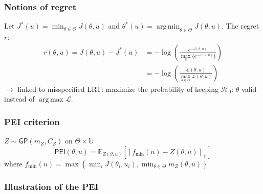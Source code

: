 \documentclass[11pt]{beamer}
\newcommand{\Ex}{\mathbb{E}}
\newcommand{\GP}{\mathsf{GP}}
\DeclareMathOperator*{\argmin}{arg\,min}
\DeclareMathOperator*{\argmax}{arg\,max}
\newcommand{\kk}{\theta}
\newcommand{\uu}{u}
\newcommand{\Uspace}{\mathbb{U}}
\newcommand{\Kspace}{\Theta}
\newcommand\manupath{/home/victor/acadwriting/Manuscrit/Text/}
\begin{document}
\begin{frame}
  \frametitle{Notions of regret}
  Let $J^*(\uu) = \min_{\kk \in \Kspace} J(\kk, \uu)$ and $\kk^*(\uu) = \argmin_{\kk\in\Kspace} J(\kk, \uu)$.
  The regret $r$:
  \begin{align}
    r(\kk, \uu) = J(\kk, \uu) - J^*(\uu) &= -\log \left(\frac{e^{-J(\kk, \uu)}}{\max_{\kk}\{   e^{-J(\kk, \uu)}\}}\right) \\
                                         &= - \log \left(\frac{\mathcal{L}(\kk, \uu)}{\max_{\kk\in\Kspace} \mathcal{L}(\kk, \uu)}\right)
  \end{align}
  $\rightarrow$ linked to misspecified LRT: maximize the probability of keeping $\mathcal{H}_0$: $\kk$ valid instead of $\argmax \mathcal{L}$.
\end{frame}
\begin{frame}
  \frametitle{PEI criterion}
  $Z \sim \GP(m_Z, C_Z)$ on $\Kspace \times \Uspace$
  \begin{equation}
    \mathsf{PEI}(\kk, \uu) = \Ex_{Z(\kk, \uu)}\left[ \left[f_{\min}(\uu) - Z(\kk, \uu)\right]_+\right]
  \end{equation}
where $f_{\min}(\uu) = \max\left\{\min_i J(\kk_i, \uu_i), \min_{\kk\in\Kspace} m_Z(\kk, \uu)\right\}$

\end{frame}
\begin{frame}
  \frametitle{Illustration of the PEI}
  \resizebox{\textwidth}{!}{
    
    }
\end{frame}
\end{document}
